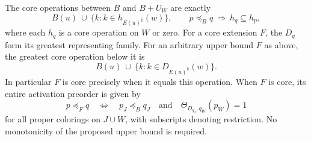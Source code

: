 \begin{theorem}
\label{core:thm:block-source-extension}
The core operations between $B$ and $B+U_W$ are exactly
\[
 B(u)\ \cup\ \{k:k\in h_{E(u)^{\widehat k}}(w)\},
 \qquad p\preceq_B q\ \Longrightarrow\ h_q\subseteq h_p ,
\]
where each $h_q$ is a core operation on $W$ or zero. For a core
extension $F$, the $D_q$ form its greatest representing family.
For an arbitrary upper bound $F$ as above, the greatest core
operation below it is
\[
 B(u)\ \cup\ \{k:k\in D_{E(u)^{\widehat k}}(w)\}.
\]
In particular $F$ is core precisely when it equals this operation.
When $F$ is core, its entire activation preorder is given by
\[
 p\preceq_F q
 \quad\Longleftrightarrow\quad
 p_J\preceq_B q_J\quad\text{and}\quad
 \Theta_{D_{q_J},q_W}(p_W)=1
\]
for all proper colorings on $J\cup W$, with subscripts denoting
restriction. No monotonicity of the proposed upper bound is required.
\end{theorem}
